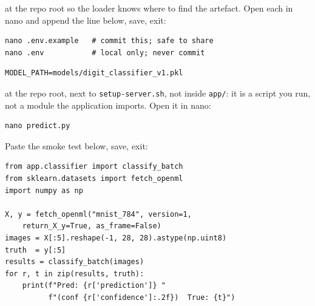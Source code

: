 
 at the repo
root so the loader knows where to find the artefact. Open each in nano
and append the line below, save, exit:

\begin{verbatim}
nano .env.example   # commit this; safe to share
nano .env           # local only; never commit
\end{verbatim}

\begin{verbatim}
MODEL_PATH=models/digit_classifier_v1.pkl
\end{verbatim}

 at the repo root,
next to \texttt{setup-server.sh}, not inside \texttt{app/}: it is a
script you run, not a module the application imports. Open it in nano:

\begin{verbatim}
nano predict.py
\end{verbatim}

Paste the smoke test below, save, exit:

\begin{verbatim}
from app.classifier import classify_batch
from sklearn.datasets import fetch_openml
import numpy as np

X, y = fetch_openml("mnist_784", version=1,
    return_X_y=True, as_frame=False)
images = X[:5].reshape(-1, 28, 28).astype(np.uint8)
truth  = y[:5]
results = classify_batch(images)
for r, t in zip(results, truth):
    print(f"Pred: {r['prediction']} "
          f"(conf {r['confidence']:.2f})  True: {t}")
\end{verbatim}

